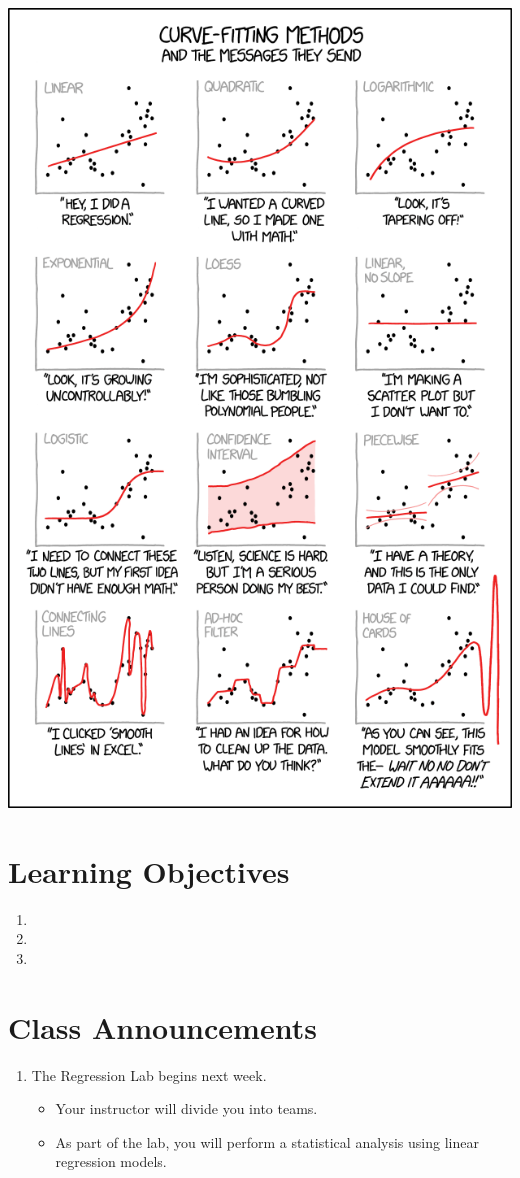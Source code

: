 \documentclass[
]{book}
\providecommand{\tightlist}{%
  \setlength{\itemsep}{0pt}\setlength{\parskip}{0pt}}
\theoremstyle{definition}
\theoremstyle{definition}
\theoremstyle{definition}
\theoremstyle{definition}
\theoremstyle{remark}
\begin{document}
\includegraphics[width=0.8\linewidth,height=\textheight,keepaspectratio]{./images/curve_fitting.png}

\section{Learning Objectives}\label{learning-objectives-9}

\begin{enumerate}
\def\labelenumi{\arabic{enumi}.}
\tightlist
\item
\item
\item
\end{enumerate}

\section{Class Announcements}\label{class-announcements-8}

\begin{enumerate}
\def\labelenumi{\arabic{enumi}.}
\tightlist
\item
  The Regression Lab begins next week.

  \begin{itemize}
  \tightlist
  \item
    Your instructor will divide you into teams.
  \item
    As part of the lab, you will perform a statistical analysis using linear regression models.
  \end{itemize}
\end{enumerate}
\end{document}
